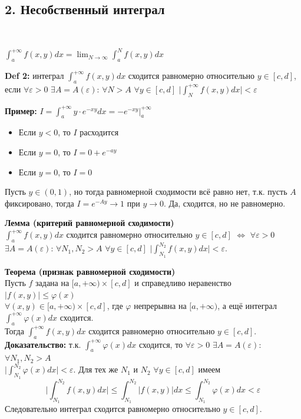 \documentclass[book, 11pt]{report}
\begin{document}
\subsection*{2. Несобственный интеграл}
\par{\ }
\par{$\displaystyle\int_a^{+\infty}f(x,y)dx=\lim_{N\to\infty}\int_a^Nf(x,y)dx$}
\par{\textbf{Def 2: }интеграл $\displaystyle\int_a^{+\infty}f(x,y)dx$ сходится равномерно относительно $y\in[c,d]$, если $\forall\varepsilon>0$ $\exists A=A(\varepsilon)$: $\forall N>A$ $\forall y\in[c,d]$ $\displaystyle\bigg|\int_N^{+\infty}f(x,y)dx\bigg|<\varepsilon$}
\newpage
\par{\textbf{Пример: }
$\displaystyle I=\int_a^{+\infty}y\cdot e^{-xy}dx=-e^{-xy}\bigg|_a^{+\infty}$
\begin{itemize}
    \item Если $y<0$, то $I$ расходится
    \item Если $y=0$, то $I=0+e^{-ay}$
    \item Если $y=0$, то $I=0$
\end{itemize}
Пусть $y\in(0,1)$, но тогда равномерной сходимости всё равно нет, т.к. пусть $A$ фиксировано, тогда $I=e^{-Ay}\to1$ при $y\to0$. Да, сходится, но не равномерно.
}
\vspace{0.6cm}
\par{\textbf{Лемма (критерий равномерной сходимости)}\\
$\displaystyle\int_a^{+\infty}f(x,y)dx$ сходится равномерно относительно $y\in[c,d]$ $\Leftrightarrow$ $\forall\varepsilon>0$ $\exists A=A(\varepsilon)$: $\forall N_1,N_2>A$ $\forall y\in[c,d]$ $\displaystyle\bigg|\int_{N_1}^{N_2}f(x,y)dx\bigg|<\varepsilon$.
}
\vspace{1.0cm}
\par{\textbf{Теорема (признак равномерной сходимости)}\\
Пусть $f$ задана на $[a,+\infty)\times[c,d]$ и справедливо неравенство $|f(x,y)|\leq\varphi(x)$ \\$\forall(x,y)\in[a,+\infty)\times[c,d]$, где $\varphi$ непрерывна на $[a,+\infty)$, а ещё интеграл $\displaystyle\int_a^{+\infty}\varphi(x)dx$ сходится.\\ Тогда $\displaystyle\int_a^{+\infty}f(x,y)dx$ сходится равномерно относительно $y\in[c,d]$.\\
\textbf{Доказательство: }т.к. $\displaystyle\int_a^{+\infty}\varphi(x)dx$ сходится, то $\forall\varepsilon>0$ $\exists A=A(\varepsilon)$: $\forall N_1,N_2>A$ \\$\displaystyle\bigg|\int_{N_1}^{N_2}\varphi(x)dx\bigg|<\varepsilon$. Для тех же $N_1$ и $N_2$ $\forall y\in[c,d]$ имеем
\begin{equation*}
    \bigg|\int_{N_1}^{N_2}f(x,y)dx\bigg|\leq\int_{N_1}^{N_2}|f(x,y)|dx\leq\int_{N_1}^{N_2}\varphi(x)dx<\varepsilon
\end{equation*}
Следовательно интеграл сходится равномерно относительно $y\in[c,d]$.
}
\end{document}
